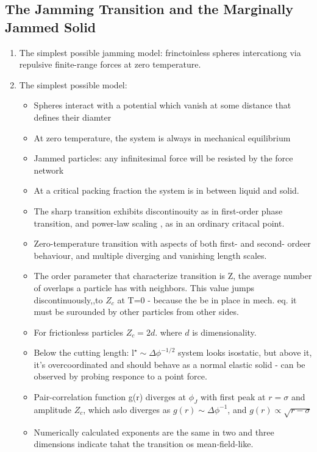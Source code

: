 \documentclass[10pt,a4paper]{article}
\begin{document}
\subsection{The Jamming Transition and the Marginally Jammed Solid\cite{liunagel:10}}
\begin{enumerate}
 \item The simplest possible jamming model: frinctoinless spheres intercationg via repulsive finite-range forces at zero temperature.
 \item The simplest possible model:
 \begin{itemize}
  \item Spheres interact with a potential which vanish at some distance that defines their diamter
  \item At zero temperature, the system is always in mechanical equilibrium
  \item Jammed particles: any infinitesimal force will be resisted by the force network
  \item At a critical packing fraction the system is in between liquid and solid.
  \item The sharp transition exhibits discontinouity as in first-order phase transition, and power-law scaling , as in an ordinary critacal point. 
  \item Zero-temperature transition with aspects of both first- and second- ordeer behaviour, and multiple diverging and vanishing length scales. 
  \item The order parameter that characterize transition is Z, the average number of overlaps a particle has with neighbors. 
  This value jumps discontinuously,,to $Z_c$ at T=0 - because the be in place in mech. eq. it must be surounded by other particles from other sides. 
  \item For frictionless particles $Z_c=2d$. where $d$ is dimensionality.
  \item Below the cutting length: $ \mathrm{l}^{\star}\sim \Delta\phi^{-1/2}$ system looks isostatic, but above it, it's overcoordinated and should behave as a normal elastic solid - can be observed by probing responce to a point force.
  \item Pair-correlation function g(r) diverges at $\phi_J$ with first peak at $r=\sigma$ and amplitude $Z_c$, 
  which aslo diverges as $g(r) \sim \Delta \phi^{-1}$, and $g(r) \propto \sqrt{r-\sigma}$
  \item Numerically calculated exponents are the same in two and three dimensions indicate tahat the transition os mean-field-like. 

\end{itemize}
\end{enumerate}
\end{document}
